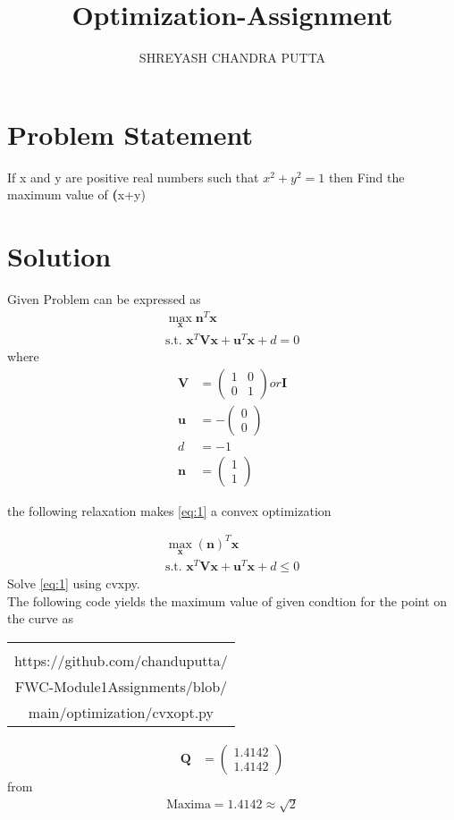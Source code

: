 \documentclass[journal,10pt,twocolumn]{article}
\title{
Optimization-Assignment
}
\author{SHREYASH CHANDRA PUTTA}
\newcommand{\myvec}[1]{\ensuremath{\begin{pmatrix}#1\end{pmatrix}}}
\let\vec\mathbf
\let\vec\mathbf
\providecommand{\brak}[1]{\ensuremath{\left(#1\right)}}
\begin{document}
\maketitle
\tableofcontents
\bigskip
\section{Problem Statement}
If x and y are positive real numbers such that $x^2 +y^2 = 1$ then Find the maximum value of \textbf(x+y)

\section{Solution}

Given Problem can be expressed as 
\begin{align}
\label{eq:1}
\max_{\vec{x}}{\vec{n}}^T{\vec{x}}\\
\label{eq:2}
\text {s.t. }\vec{x}^T\vec{V}\vec{x} + \vec{u}^T\vec{x}  +d = 0
\end{align}
%
where
%
\begin{align}
\vec{V} &= \myvec{1 & 0\\0 & 1} or \vec{I}
\\
\vec{u} &= -\myvec{0 \\ 0}
\\
d &= -1
\\
\vec{n} &= \myvec{1 \\ 1}
\end{align}

the following relaxation makes
\eqref{eq:1} a convex optimization 

\begin{align}
\label{eq:7}
\max_{\vec{x}}\brak{\vec{n}}^T{\vec{x}}\\
\text{s.t. }\vec{x}^T\vec{V}\vec{x} + \vec{u}^T\vec{x} + d \le 0
\end{align}
Solve \eqref{eq:1} using cvxpy.
\\
The following code yields the maximum value of given condtion for the point on the curve as
%
{\setlength\extrarowheight{0pt}
\begin{table}[h]
    \centering
    \begin{tabular}{|c|}
    \hline \\
         https://github.com/chanduputta/\\FWC-Module1Assignments/blob/\\main/optimization/cvxopt.py  \\       
\hline
    \end{tabular}
\end{table}}
%
\begin{align}
\vec{Q} &= \myvec{1.4142\\1.4142}
\end{align}
from 
\begin{align}
\boxed{\text{Maxima} = 1.4142 \approx \sqrt{2}} \\
\end{align}
\end{document}

